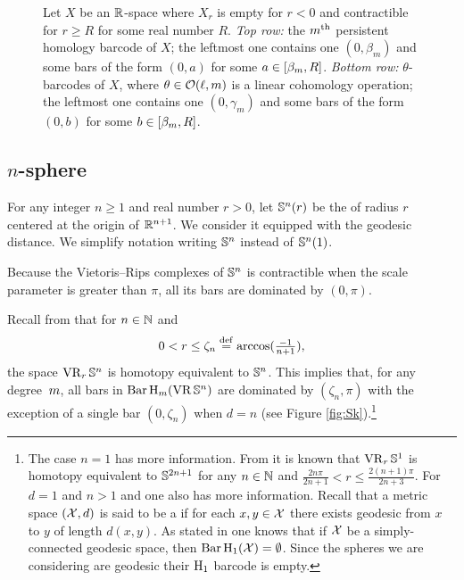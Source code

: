 \begin{figure}
	\centering
	
	\caption{Let $X$ be an $\mathbb{R}$-space where $X_r$ is empty for $r<0$ and contractible for $r\geq R$ for some real number $R$. \emph{Top row:} the $m^{\mathrm{th}}$ persistent homology barcode of $X$; the leftmost one contains one $(0,\beta_m)$ and some bars of the form $(0,a)$ for some $a\in [\beta_m, R]$.
		\emph{Bottom row:} $\theta$-barcodes of $X$, where $\theta\in\mathcal{O}(\ell,m)$ is a linear cohomology operation; the leftmost one contains one $(0,\gamma_m)$ and some bars of the form $(0,b)$ for some $b\in [\beta_m, R]$.}
	\label{fig:barcodes_general}
\end{figure}

\subsection{$n$-sphere}\label{ss:Sn}

For any integer $n \geq 1$ and real number $r > 0$, let $\mathbb{S}^n(r)$ be the  of radius $r$ centered at the origin of $\mathbb{R}^{n+1}$.
We consider it equipped with the geodesic distance.
We simplify notation writing \(\mathbb{S}^n\) instead of \(\mathbb{S}^n(1)\).

Because the Vietoris--Rips complexes of $\mathbb{S}^n$ is contractible when the scale parameter is greater than $\pi$, all its bars are dominated by $(0, \pi)$.

Recall from \cite[Thm.~7.1]{lim2020vietoris} that for $n \in \mathbb{N}$ and
\[
0 < r \leq \zeta_n \stackrel{\mathrm{def}}{=} \arccos(\tfrac{-1}{n+1}),
\]
the space $\operatorname{VR}_r\mathbb{S}^n$ is homotopy equivalent to $\mathbb{S}^n$.
This implies that, for any degree~$m$, all bars in $\operatorname{Bar}\mathrm{H}_m (\operatorname{VR}\mathbb{S}^n)$ are dominated by $(\zeta_n,\pi)$ with the exception of a single bar $(0,\zeta_n)$ when $d = n$ (see Figure \ref{fig:Sk}).\footnote{
	The case $n = 1$ has more information.
	From \cite[Thm.~7.4]{adamaszek2017vietoris} it is known that $\operatorname{VR}_r\mathbb{S}^1$ is homotopy equivalent to $\mathbb{S}^{2n+1}$ for any $n \in \mathbb{N}$ and $\frac{2n\pi}{2n+1} < r \leq \frac{2(n+1)\pi}{2n+3}$.
	For $d=1$ and $n > 1$ and one also has more information.
	Recall that a metric space $(\mathcal{X}, d)$ is said to be a  if for each $x, y \in \mathcal{X}$ there exists geodesic from $x$ to $y$ of length $d(x, y)$.
	As stated in \cite[Prop.~7.10]{virk20201} one knows that if $\mathcal{X}$ be a simply-connected geodesic space, then $\operatorname{Bar}\mathrm{H}_1(\mathcal{X}) = \emptyset$.
	Since the spheres we are considering are geodesic their $\mathrm{H}_1$ barcode is empty. }


